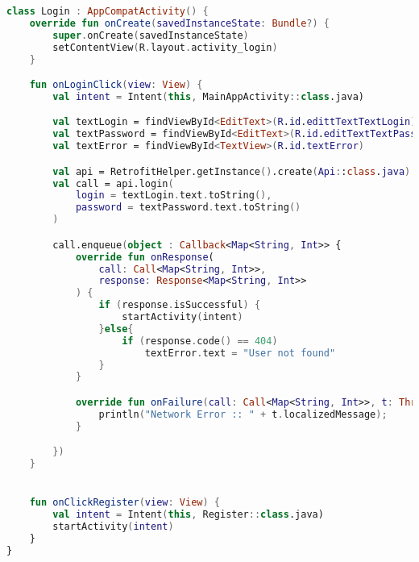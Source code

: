 \begin{lstlisting}[language=Kotlin, caption=\leftline{Login}, label=lst:Login]
class Login : AppCompatActivity() {
    override fun onCreate(savedInstanceState: Bundle?) {
        super.onCreate(savedInstanceState)
        setContentView(R.layout.activity_login)
    }

    fun onLoginClick(view: View) {
        val intent = Intent(this, MainAppActivity::class.java)

        val textLogin = findViewById<EditText>(R.id.edittTextTextLogin)
        val textPassword = findViewById<EditText>(R.id.editTextTextPassword)
        val textError = findViewById<TextView>(R.id.textError)

        val api = RetrofitHelper.getInstance().create(Api::class.java)
        val call = api.login(
            login = textLogin.text.toString(),
            password = textPassword.text.toString()
        )

        call.enqueue(object : Callback<Map<String, Int>> {
            override fun onResponse(
                call: Call<Map<String, Int>>,
                response: Response<Map<String, Int>>
            ) {
                if (response.isSuccessful) {
                    startActivity(intent)
                }else{
                    if (response.code() == 404)
                        textError.text = "User not found"
                }
            }

            override fun onFailure(call: Call<Map<String, Int>>, t: Throwable) {
                println("Network Error :: " + t.localizedMessage);
            }

        })
    }


    fun onClickRegister(view: View) {
        val intent = Intent(this, Register::class.java)
        startActivity(intent)
    }
}
\end{lstlisting}

